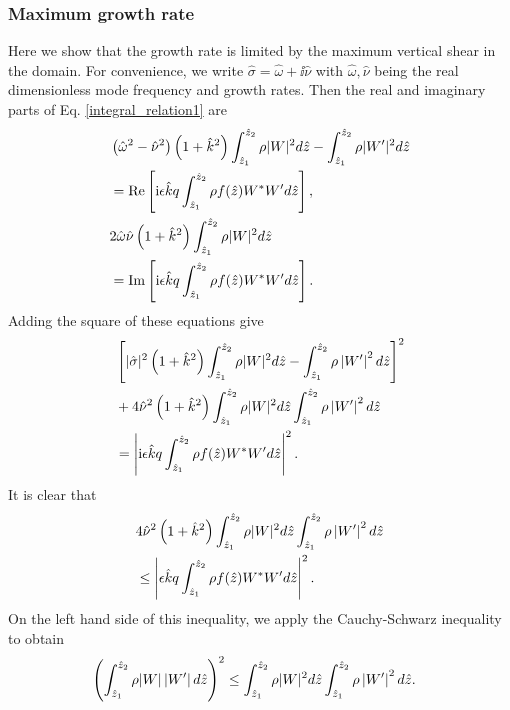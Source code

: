 \subsubsection{Maximum growth rate}   
Here we show that the growth rate is limited by the maximum vertical
shear in the domain. For convenience, we write $\hat{\sigma} = \hat{\omega} +
\ii\hat{\nu}$ with $\hat{\omega},\hat{\nu}$ being the real dimensionless
mode frequency and growth rates. Then the real and imaginary parts of
Eq. \ref{integral_relation1} are
\begin{align}
  &\left(\hat{\omega}^2-\hat{\nu}^2\right)\left(1+\hat{k}^2\right)
  \int_{\hat{z}_1}^{\hat{z}_2}\rho|W|^2d\hat{z} -
  \int_{\hat{z}_1}^{\hat{z}_2}\rho|W^\prime|^2d\hat{z}
  \notag\\
  &=\operatorname{Re}\left[\mathrm{i}
    \epsilon\hat{k}q \int_{\hat{z}_1}^{\hat{z}_2}\rho
    f(\hat{z}) W^*W^\prime d\hat{z}\right], \notag\\
& 2\hat{\omega}\hat{\nu}\left(1+\hat{k}^2\right)
   \int_{\hat{z}_1}^{\hat{z}_2}\rho|W|^2d\hat{z}\notag\\
   &=\operatorname{Im}\left[\mathrm{i}
     \epsilon\hat{k}q \int_{\hat{z}_1}^{\hat{z}_2}\rho
     f(\hat{z}) W^*W^\prime d\hat{z}\right].
\end{align}
Adding the square of these equations give
\begin{align}
&\left[|\hat{\sigma}|^2\left(1+\hat{k}^2\right)
   \int_{\hat{z}_1}^{\hat{z}_2}\rho|W|^2d\hat{z} -
  \int_{\hat{z}_1}^{\hat{z}_2}\rho\left|W^\prime \right|^2d\hat{z}\right]^2\notag\\
&+4\hat{\nu}^2\left(1+\hat{k}^2\right) 
  \int_{\hat{z}_1}^{\hat{z}_2}\rho
   |W|^2d\hat{z}\int_{\hat{z}_1}^{\hat{z}_2}\rho\left|W^\prime \right|^2d\hat{z}\notag\\
   &=\left|\mathrm{i}
  \epsilon\hat{k}q\int_{\hat{z}_1}^{\hat{z}_2}\rho
 f(\hat{z}) W^*W^\prime d\hat{z}\right|^2.
\end{align}
It is clear that
\begin{align}\label{sigma_finite_domain} 
&4\hat{\nu}^2\left(1+\hat{k}^2\right) 
  \int_{\hat{z}_1}^{\hat{z}_2}\rho
   |W|^2d\hat{z}\int_{\hat{z}_1}^{\hat{z}_2}\rho\left|W^\prime \right|^2d\hat{z}\notag\\
   &\leq\left|
  \epsilon\hat{k}q\int_{\hat{z}_1}^{\hat{z}_2}\rho
 f(\hat{z}) W^*W^\prime d\hat{z}\right|^2.
\end{align}
On the left hand side of this inequality, we apply the Cauchy-Schwarz
inequality to obtain
\begin{align}
  &\left( \int_{\hat{z}_1}^{\hat{z}_2}\rho
    |W|\left|W^\prime \right|d\hat{z}\right)^2\leq
  \int_{\hat{z}_1}^{\hat{z}_2}\rho 
  |W|^2d\hat{z}\int_{\hat{z}_1}^{\hat{z}_2}\rho\left|W^\prime \right|^2d\hat{z}.
\end{align}
